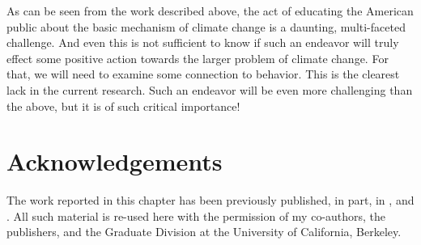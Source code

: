 
As can be seen from the work described above, the act of educating the American
public about the basic mechanism of climate change is a daunting, multi-faceted
challenge. And even this is not sufficient to know if such an endeavor will
truly effect some positive action towards the larger problem of climate change.
For that, we will need to examine some connection to behavior. This is the
clearest lack in the current research. Such an endeavor will be even more
challenging than the above, but it is of such critical importance! 



\section*{Acknowledgements}

The work reported in this chapter has been previously published, in part, in
\textcite{ranney_improving_2012_f,ranney_changing_2012}, and
\textcite{clark_knowledge_inpress}.  All such material is re-used here with the
permission of my co-authors, the publishers, and the Graduate Division at the
University of California, Berkeley.
